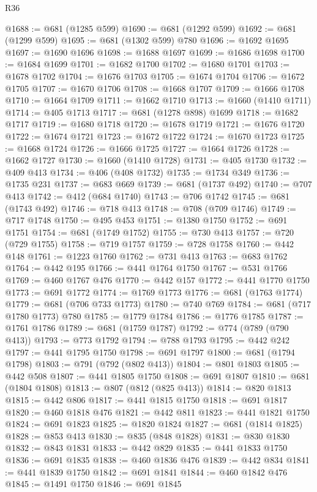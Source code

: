 \begin{lexlean}{R36}
\begin{coremodule}
{{{{{{{{{{{{{{{{{{{{{{{{{{{{{{{{{{{{{{{{{{{{{{{{{{{{{{{{{{{{{{{{{{{{{{{{{{{{{{{{{{@1688 := @681 (@1285 @599)
@1690 := @681 (@1292 @599)
@1692 := @681 (@1299 @599)
@1695 := @681 (@1302 @599) @780
@1696 := @1692 @1695
@1697 := @1690 @1696
@1698 := @1688 @1697
@1699 := @1686 @1698
@1700 := @1684 @1699
@1701 := @1682 @1700
@1702 := @1680 @1701
@1703 := @1678 @1702
@1704 := @1676 @1703
@1705 := @1674 @1704
@1706 := @1672 @1705
@1707 := @1670 @1706
@1708 := @1668 @1707
@1709 := @1666 @1708
@1710 := @1664 @1709
@1711 := @1662 @1710
@1713 := @1660 (@1410 @1711)
@1714 := @405 @1713
@1717 := @681 (@1278 @898) @1699
@1718 := @1682 @1717
@1719 := @1680 @1718
@1720 := @1678 @1719
@1721 := @1676 @1720
@1722 := @1674 @1721
@1723 := @1672 @1722
@1724 := @1670 @1723
@1725 := @1668 @1724
@1726 := @1666 @1725
@1727 := @1664 @1726
@1728 := @1662 @1727
@1730 := @1660 (@1410 @1728)
@1731 := @405 @1730
@1732 := @409 @413
@1734 := @406 (@408 @1732)
@1735 := @1734 @349
@1736 := @1735 @231
@1737 := @683 @669
@1739 := @681 (@1737 @492)
@1740 := @707 @413
@1742 := @412 (@684 @1740)
@1743 := @706 @1742
@1745 := @681 (@1743 @492)
@1746 := @718 @413
@1748 := @708 (@709 @1746)
@1749 := @717 @1748
@1750 := @495 @453
@1751 := @1380 @1750
@1752 := @691 @1751
@1754 := @681 (@1749 @1752)
@1755 := @730 @413
@1757 := @720 (@729 @1755)
@1758 := @719 @1757
@1759 := @728 @1758
@1760 := @442 @148
@1761 := @1223 @1760
@1762 := @731 @413
@1763 := @683 @1762
@1764 := @442 @195
@1766 := @441 @1764 @1750
@1767 := @531 @1766
@1769 := @460 @1767 @476
@1770 := @442 @157
@1772 := @441 @1770 @1750
@1773 := @691 @1772
@1774 := @1769 @1773
@1776 := @681 (@1763 @1774)
@1779 := @681 (@706 @733 @1773)
@1780 := @740 @769
@1784 := @681 (@717 @1780 @1773) @780
@1785 := @1779 @1784
@1786 := @1776 @1785
@1787 := @1761 @1786
@1789 := @681 (@1759 @1787)
@1792 := @774 (@789 (@790 @413))
@1793 := @773 @1792
@1794 := @788 @1793
@1795 := @442 @242
@1797 := @441 @1795 @1750
@1798 := @691 @1797
@1800 := @681 (@1794 @1798)
@1803 := @791 (@792 (@802 @413))
@1804 := @801 @1803
@1805 := @442 @508
@1807 := @441 @1805 @1750
@1808 := @691 @1807
@1810 := @681 (@1804 @1808)
@1813 := @807 (@812 (@825 @413))
@1814 := @820 @1813
@1815 := @442 @806
@1817 := @441 @1815 @1750
@1818 := @691 @1817
@1820 := @460 @1818 @476
@1821 := @442 @811
@1823 := @441 @1821 @1750
@1824 := @691 @1823
@1825 := @1820 @1824
@1827 := @681 (@1814 @1825)
@1828 := @853 @413
@1830 := @835 (@848 @1828)
@1831 := @830 @1830
@1832 := @843 @1831
@1833 := @442 @829
@1835 := @441 @1833 @1750
@1836 := @691 @1835
@1838 := @460 @1836 @476
@1839 := @442 @834
@1841 := @441 @1839 @1750
@1842 := @691 @1841
@1844 := @460 @1842 @476
@1845 := @1491 @1750
@1846 := @691 @1845
}}}}}}}}}}}}}}}}}}}}}}}}}}}}}}}}}}}}}}}}}}}}}}}}}}}}}}}}}}}}}}}}}}}}}}}}}}}}}}}}}}
\end{coremodule}
\end{lexlean}
